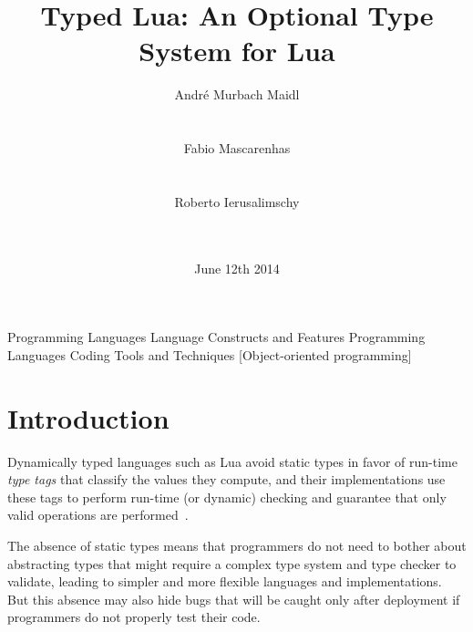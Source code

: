 \documentclass[preprint]{sig-alternate}
\begin{document}

\title{Typed Lua: An Optional Type System for Lua}


\author{
\alignauthor
André Murbach Maidl\\
  \\
  \\
\alignauthor
Fabio Mascarenhas\\
  \\
  \\
\alignauthor
Roberto Ierusalimschy\\
  \\
  \\
}

\date{June 12th 2014}

\maketitle

\begin{abstract}
\end{abstract}

         {Programming Languages}
         {Language Constructs and Features}
         {Programming Languages}
         {Coding Tools and Techniques}
         [Object-oriented programming]



\section{Introduction} \label{sec:intro}

Dynamically typed languages such as Lua avoid static types in favor of
run-time {\em type tags} that classify the values they compute, and
their implementations use these tags to perform run-time (or dynamic)
checking and guarantee that only valid operations are
performed~\citep{pierce2002tpl}.

The absence of static types means that programmers do not need to
bother about abstracting types that might require a complex type
system and type checker to validate, leading to simpler and more flexible
languages and implementations. But this absence may also hide bugs
that will be caught only after deployment if programmers do not properly
test their code.
\end{document}
